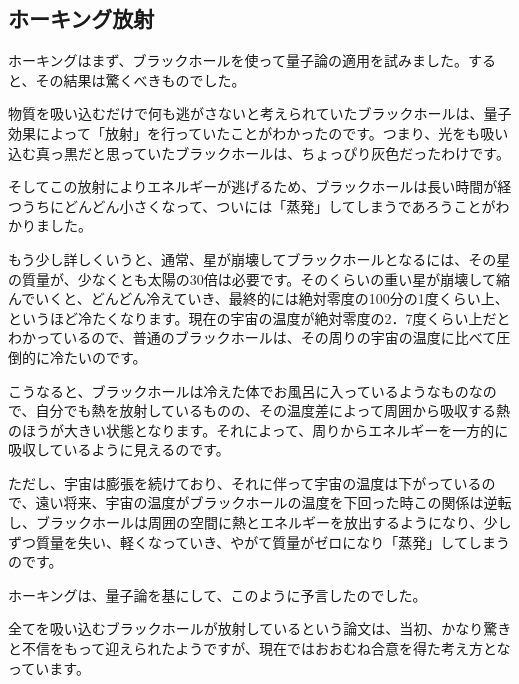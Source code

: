 \documentclass[10pt,b5paper,papersize,dvipdfmx]{jsbook}
\begin{document}
\subsection{ホーキング放射}
ホーキングはまず、ブラックホールを使って量子論の適用を試みました。すると、その結果は驚くべきものでした。\par
物質を吸い込むだけで何も逃がさないと考えられていたブラックホールは、量子効果によって「放射」を行っていたことがわかったのです。つまり、光をも吸い込む真っ黒だと思っていたブラックホールは、ちょっぴり灰色だったわけです。\par
そしてこの放射によりエネルギーが逃げるため、ブラックホールは長い時間が経つうちにどんどん小さくなって、ついには「蒸発」してしまうであろうことがわかりました。\par
もう少し詳しくいうと、通常、星が崩壊してブラックホールとなるには、その星の質量が、少なくとも太陽の30倍は必要です。そのくらいの重い星が崩壊して縮んでいくと、どんどん冷えていき、最終的には絶対零度の100分の1度くらい上、というほど冷たくなります。現在の宇宙の温度が絶対零度の2．7度くらい上だとわかっているので、普通のブラックホールは、その周りの宇宙の温度に比べて圧倒的に冷たいのです。\par
こうなると、ブラックホールは冷えた体でお風呂に入っているようなものなので、自分でも熱を放射しているものの、その温度差によって周囲から吸収する熱のほうが大きい状態となります。それによって、周りからエネルギーを一方的に吸収しているように見えるのです。\par
ただし、宇宙は膨張を続けており、それに伴って宇宙の温度は下がっているので、遠い将来、宇宙の温度がブラックホールの温度を下回った時この関係は逆転し、ブラックホールは周囲の空間に熱とエネルギーを放出するようになり、少しずつ質量を失い、軽くなっていき、やがて質量がゼロになり「蒸発」してしまうのです。\par
ホーキングは、量子論を基にして、このように予言したのでした。\par
全てを吸い込むブラックホールが放射しているという論文は、当初、かなり驚きと不信をもって迎えられたようですが、現在ではおおむね合意を得た考え方となっています。
\end{document}
